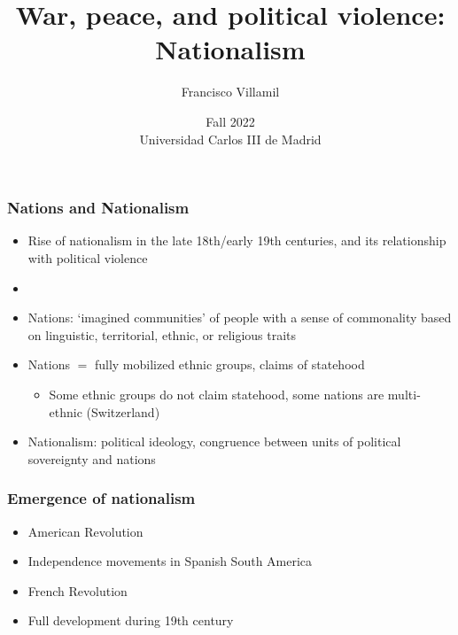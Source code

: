 \documentclass[utf8, xcolor=dvipsnames]{beamer}
\title[War, peace, and political violence]{War, peace, and political violence:\\Nationalism}
\author[Francisco Villamil]{Francisco Villamil}
\date[UC3M / Fall 2022]{Fall 2022\\Universidad Carlos III de Madrid}
\begin{document}
\begin{frame}
  \titlepage
\end{frame}

\begin{frame}
\frametitle{Nations and Nationalism}
\centering

\begin{itemize}[<+->]
  \item Rise of nationalism in the late 18th/early 19th centuries, and its relationship with political violence
  \item[]
  \item Nations: `imagined communities' of people with a sense of commonality based on linguistic, territorial, ethnic, or religious traits
  \item Nations $=$ fully mobilized ethnic groups, claims of statehood
  \begin{itemize}
    \item Some ethnic groups do not claim statehood, some nations are multi-ethnic (Switzerland)
  \end{itemize}
  \item Nationalism: political ideology, congruence between units of political sovereignty and nations
\end{itemize}

\end{frame}

\begin{frame}
\frametitle{Emergence of nationalism}
\centering

\begin{itemize}[<+->]
  \item American Revolution
  \item Independence movements in Spanish South America
  \item French Revolution
  \item Full development during 19th century
\end{itemize}

\end{frame}
\end{document}
